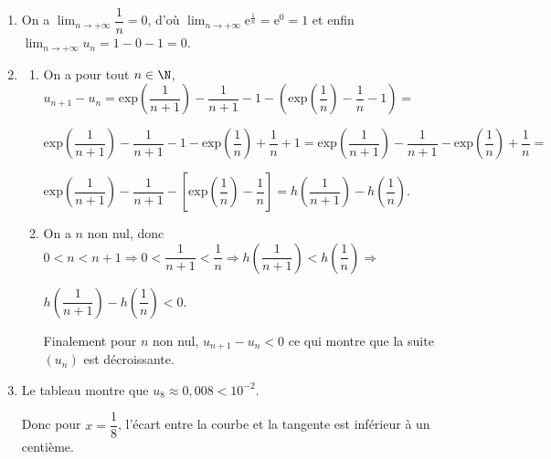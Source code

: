 \begin{enumerate}[resume]
\item 
On a $\displaystyle\lim_{n \to + \infty} \dfrac{1}{n} = 0$, d'où $\displaystyle\lim_{n \to + \infty} \text{e}^{\frac1n} = \text{e}^0 = 1$ et enfin $\displaystyle\lim_{n \to + \infty} u_n = 1 - 0 - 1 = 0$.
\item 
	\begin{enumerate}
		\item 
		



On a pour tout $n \in \N$, \: $u_{n+1} - u_n = \text{exp} \left(\dfrac{1}{n+1}\right) - \dfrac{1}{n+1} - 1 - \left(\text{exp} \left(\dfrac{1}{n}\right) - \dfrac{1}{n} - 1 \right) =$

$ \text{exp} \left(\dfrac{1}{n+1}\right) - \dfrac{1}{n+1} - 1 - \text{exp} \left(\dfrac{1}{n}\right) + \dfrac{1}{n} + 1 = \text{exp} \left(\dfrac{1}{n+1}\right) - \dfrac{1}{n+1}  - \text{exp} \left(\dfrac{1}{n}\right) + \dfrac{1}{n}  =$

$\text{exp} \left(\dfrac{1}{n+1}\right) - \dfrac{1}{n+1}  - \left[\text{exp} \left(\dfrac{1}{n}\right) - \dfrac{1}{n}\right] =  h\left(\dfrac{1}{n + 1}\right) - h\left(\dfrac{1}{n}\right)$.
		\item 
		
On a $n$ non nul, donc $0 < n < n + 1 \Rightarrow 0< \dfrac{1}{n+1} < \dfrac{1}{n} \Rightarrow h\left(\dfrac{1}{n+1}\right) < h\left(\dfrac{1}{n}\right) \Rightarrow$
		
		$ h\left(\dfrac{1}{n + 1}\right) - h\left(\dfrac{1}{n}\right) < 0$.
		
		Finalement pour $n$ non nul, $u_{n+1} - u_n < 0$ ce qui montre que la suite $\left(u_n\right)$ est décroissante.
	\end{enumerate}
\item 


















Le tableau montre que $u_8 \approx 0,008 < 10^{-2}$.

Donc pour $x = \dfrac{1}{8}$, l'écart entre la courbe et la tangente est inférieur à un centième.

\end{enumerate}

\bigskip
